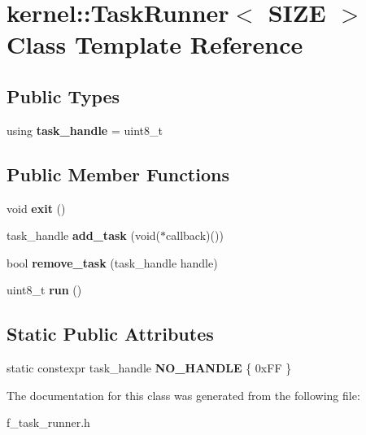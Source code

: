 \hypertarget{classkernel_1_1_task_runner}{}\section{kernel\+::Task\+Runner$<$ S\+I\+ZE $>$ Class Template Reference}
\label{classkernel_1_1_task_runner}
\subsection*{Public Types}
\begin{DoxyCompactItemize}
\item 
\mbox{\label{classkernel_1_1_task_runner_ae56598d5bb6e0a2c76c33415595dd6a5}} 
using {\bfseries task\+\_\+handle} = uint8\+\_\+t
\end{DoxyCompactItemize}
\subsection*{Public Member Functions}
\begin{DoxyCompactItemize}
\item 
\mbox{\label{classkernel_1_1_task_runner_a0227843c4858c4acb7f9e48361b2ef7a}} 
void {\bfseries exit} ()
\item 
\mbox{\label{classkernel_1_1_task_runner_a701eb7d80b109fe999c6b13dc04f9cda}} 
task\+\_\+handle {\bfseries add\+\_\+task} (void($\ast$callback)())
\item 
\mbox{\label{classkernel_1_1_task_runner_aeb14e6884c03d1518aa73a71f29b6cc9}} 
bool {\bfseries remove\+\_\+task} (task\+\_\+handle handle)
\item 
\mbox{\label{classkernel_1_1_task_runner_aa524a9aa5682fe23459e007d59ccc4c0}} 
uint8\+\_\+t {\bfseries run} ()
\end{DoxyCompactItemize}
\subsection*{Static Public Attributes}
\begin{DoxyCompactItemize}
\item 
\mbox{\label{classkernel_1_1_task_runner_a52e244b35d91ec3db1f5c59393dc9c30}} 
static constexpr task\+\_\+handle {\bfseries N\+O\+\_\+\+H\+A\+N\+D\+LE} \{ 0x\+F\+F \}
\end{DoxyCompactItemize}


The documentation for this class was generated from the following file\+:\begin{DoxyCompactItemize}
\item 
f\+\_\+task\+\_\+runner.\+h\end{DoxyCompactItemize}

